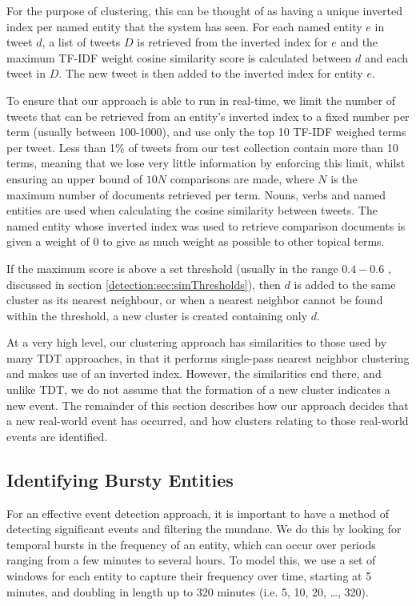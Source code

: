 For the purpose of clustering, this can be thought of as having a unique inverted index per named entity that the system has seen.
For each named entity $e$ in tweet $d$, a list of tweets $D$ is retrieved from the inverted index for $e$ and the maximum TF-IDF weight cosine similarity score is calculated between $d$ and each tweet in $D$.
The new tweet is then added to the inverted index for entity $e$.

To ensure that our approach is able to run in real-time, we limit the number of tweets that can be retrieved from an entity's inverted index to a fixed number per term (usually between 100-1000), and use only the top 10 TF-IDF weighed terms per tweet.
Less than 1\% of tweets from our test collection contain more than 10 terms, meaning that we lose very little information by enforcing this limit, whilst ensuring an upper bound of \(10N\) comparisons are made, where \(N\) is the maximum number of documents retrieved per term.
Nouns, verbs and named entities are used when calculating the cosine similarity between tweets.
The named entity whose inverted index was used to retrieve comparison documents is given a weight of 0 to give as much weight as possible to other topical terms.

If the maximum score is above a set threshold (usually in the range \(0.4-0.6\) \citep{Petrovic10}, discussed in section \ref{detection:sec:simThresholds}), then $d$ is added to the same cluster as its nearest neighbour, or when a nearest neighbor cannot be found within the threshold, a new cluster is created containing only $d$.

At a very high level, our clustering approach has similarities to those used by many TDT approaches, in that it performs single-pass nearest neighbor clustering and makes use of an inverted index.
However, the similarities end there, and unlike TDT, we do not assume that the formation of a new cluster indicates a new event.
The remainder of this section describes how our approach decides that a new real-world event has occurred, and how clusters relating to those real-world events are identified.

\subsection{Identifying Bursty Entities}
For an effective event detection approach, it is important to have a method of detecting significant events and filtering the mundane.
We do this by looking for temporal bursts in the frequency of an entity, which can occur over periods ranging from a few minutes to several hours.
To model this, we use a set of windows for each entity to capture their frequency over time, starting at 5 minutes, and doubling in length up to 320 minutes (i.e. 5, 10, 20, \ldots, 320).

